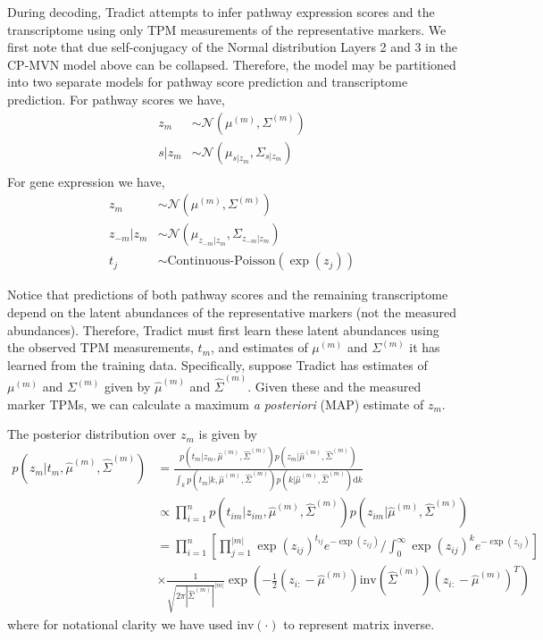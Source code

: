 \documentclass[10pt]{article}
\begin{document}
During decoding, Tradict attempts to infer pathway expression scores and the transcriptome using only TPM measurements of the representative markers. We first note that due self-conjugacy of the Normal distribution Layers 2 and 3 in the CP-MVN model above can be collapsed. Therefore, the model may be partitioned into two separate models for pathway score prediction and transcriptome prediction. For pathway scores we have,
\begin{align*}
z_m & \sim \mathcal{N}\left(\mu^{(m)}, \Sigma^{(m)} \right) \\
s|z_m & \sim \mathcal{N}(\mu_{s|z_m}, \Sigma_{s|z_m}) \\
\end{align*}
For gene expression we have,
\begin{align*}
z_m & \sim \mathcal{N}(\mu^{(m)}, \Sigma^{(m)}) \\
z_{-m}|z_m & \sim \mathcal{N}(\mu_{z_{-m}|z_m}, \Sigma_{z_{-m}|z_m}) \\
t_j & \sim \textrm{Continuous-Poisson}(\exp(z_j))
\end{align*}

Notice that predictions of both pathway scores and the remaining transcriptome depend on the latent abundances of the representative markers (not the measured abundances). Therefore, Tradict must first learn these latent abundances using the observed TPM measurements, $t_m$, and estimates of $\mu^{(m)}$ and $\Sigma^{(m)}$ it has learned from the training data. Specifically, suppose Tradict has estimates of $\mu^{(m)}$ and $\Sigma^{(m)}$ given by $\hat{\mu}^{(m)}$ and $\hat{\Sigma}^{(m)}$. Given these and the measured marker TPMs, we can calculate a maximum \emph{a posteriori} (MAP) estimate of $z_m$. 

The posterior distribution over $z_m$ is given by 
\begin{align*}
p(z_m| t_m, \hat{\mu}^{(m)}, \hat{\Sigma}^{(m)}) & =  \frac{p(t_m | z_m, \hat{\mu}^{(m)}, \hat{\Sigma}^{(m)}) p(z_m| \hat{\mu}^{(m)}, \hat{\Sigma}^{(m)}) }{ \int_k  p(t_m | k, \hat{\mu}^{(m)}, \hat{\Sigma}^{(m)}) p(k | \hat{\mu}^{(m)}, \hat{\Sigma}^{(m)}) \textrm{d}k } \\
& \propto \prod_{i=1}^{n}  p(t_{im} | z_{im}, \hat{\mu}^{(m)}, \hat{\Sigma}^{(m)}) p(z_{im}| \hat{\mu}^{(m)}, \hat{\Sigma}^{(m)}) \\
& = \prod_{i=1}^{n} \left[ \prod_{j=1}^{|m|} \exp(z_{ij})^{t_{ij}}  e^{-\exp(z_{ij})} / \int_0^\infty \exp(z_{ij})^{k}  e^{-\exp(z_{ij})} \right] \\ 
& \times \frac{1}{\sqrt{2\pi|\hat{\Sigma}^{(m)}|}^{|m|}}\exp\left(-\frac{1}{2}(z_{i:}-\hat{\mu}^{(m)}) \textrm{inv}\left( \hat{\Sigma}^{(m)} \right)(z_{i:}-\hat{\mu}^{(m)})^T \right)
\end{align*}
where for notational clarity we have used $\textrm{inv}(\cdot)$ to represent matrix inverse. 
\end{document}
